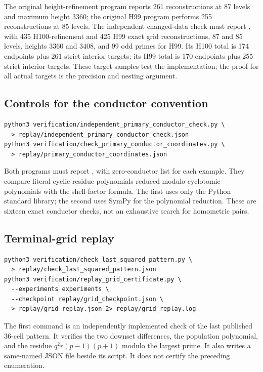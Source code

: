 \documentclass[10pt]{article}
\begin{document}
The original height-refinement program reports 261 reconstructions at
87 levels and maximum height 3360; the original H99 program performs
255 reconstructions at 85 levels. The independent changed-data check
must report , with 435 H100-refinement and 425 H99 exact
grid reconstructions, 87 and 85 levels, heights 3360 and 3408, and
99 odd primes for H99. Its H100 total is 174 endpoints plus 261 strict
interior targets; its H99 total is 170 endpoints plus 255 strict interior
targets. These target samples test the implementation;
the proof for all actual targets is the precision and nesting argument.

\subsection{Controls for the conductor convention}
\begin{lstlisting}
python3 verification/independent_primary_conductor_check.py \
  > replay/independent_primary_conductor_check.json
python3 verification/check_primary_conductor_coordinates.py \
  > replay/primary_conductor_coordinates.json
\end{lstlisting}
Both programs must report , with zero-conductor list
\file{[1]} for each example. They compare literal cyclic residue
polynomials reduced modulo cyclotomic polynomials with the shell-factor
formula. The first uses only the Python standard library; the second
uses SymPy for the polynomial reduction. These are sixteen exact
conductor checks, not an exhaustive search for homometric pairs.

\subsection{Terminal-grid replay}
\begin{lstlisting}
python3 verification/check_last_squared_pattern.py \
  > replay/check_last_squared_pattern.json
python3 verification/replay_grid_certificate.py \
  --experiments experiments \
  --checkpoint replay/grid_checkpoint.json \
  > replay/grid_replay.json 2> replay/grid_replay.log
\end{lstlisting}
The first command is an independently implemented check of the last
published 36-cell pattern. It verifies the two downset differences,
the population polynomial, and the residue
$q^2r(p-1)(p+1)$ modulo the largest prime. It also writes a same-named
JSON file beside its script. It does not certify the preceding enumeration.
\end{document}

